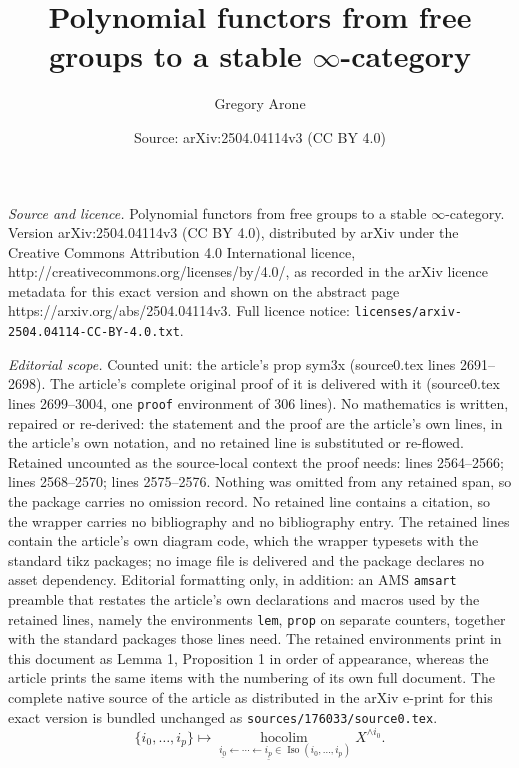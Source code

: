\documentclass[10pt,a4paper]{amsart}
\title{Polynomial functors from free groups to a stable $\infty$-category}
\author{Gregory Arone}
\date{Source: arXiv:2504.04114v3 (CC BY 4.0)}
\DeclareMathOperator{\hocolim}{hocolim \,}
\begin{document}
\maketitle

\noindent\emph{Source and licence.} Polynomial functors from free groups to a stable $\infty$-category. Version arXiv:2504.04114v3 (CC BY 4.0), distributed by arXiv under the Creative Commons Attribution 4.0 International licence, http://creativecommons.org/licenses/by/4.0/, as recorded in the arXiv licence metadata for this exact version and shown on the abstract page https://arxiv.org/abs/2504.04114v3. Full licence notice: \texttt{licenses/arxiv-2504.04114-CC-BY-4.0.txt}.\par\smallskip

\noindent\textit{Editorial scope.} Counted unit: the article's prop sym3x (source0.tex lines 2691--2698). The article's complete original proof of it is delivered with it (source0.tex lines 2699--3004, one \texttt{proof} environment of 306 lines). No mathematics is written, repaired or re-derived: the statement and the proof are the article's own lines, in the article's own notation, and no retained line is substituted or re-flowed.  Retained uncounted as the source-local context the proof needs: lines 2564--2566; lines 2568--2570; lines 2575--2576.  Nothing was omitted from any retained span, so the package carries no omission record.  No retained line contains a citation, so the wrapper carries no bibliography and no bibliography entry.  The retained lines contain the article's own diagram code, which the wrapper typesets with the standard tikz packages; no image file is delivered and the package declares no asset dependency.  Editorial formatting only, in addition: an AMS \texttt{amsart} preamble that restates the article's own declarations and macros used by the retained lines, namely the environments \texttt{lem}, \texttt{prop} on separate counters, together with the standard packages those lines need.  The retained environments print in this document as Lemma 1, Proposition 1 in order of appearance, whereas the article prints the same items with the numbering of its own full document.  The complete native source of the article as distributed in the arXiv e-print for this exact version is bundled unchanged as \texttt{sources/176033/source0.tex}.
\begin{equation}\label{eq:cubical model}
\{i_0, \ldots, i_p\}\mapsto \underset{\underline{i_0}\leftarrow \cdots \leftarrow \underline{i_p}\in \operatorname{Iso}(i_0, \ldots, i_p)}{\hocolim} X^{\wedge i_0}.
\end{equation}
\end{document}
